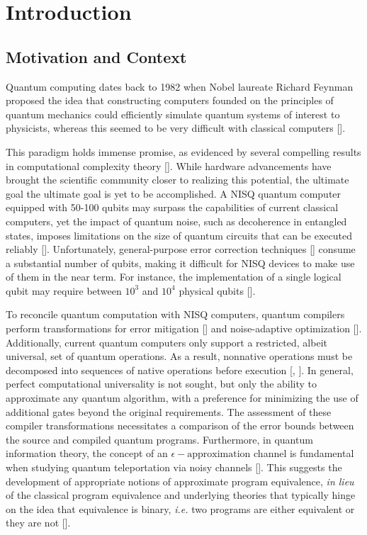 \chapter{Introduction}

\section{Motivation and Context}


Quantum computing dates back to 1982 when Nobel laureate Richard Feynman proposed the idea that constructing computers founded on the principles of quantum mechanics could efficiently simulate quantum systems of interest to physicists, whereas this seemed to be very difficult with classical computers [\cite{feynman2018simulating}].

This paradigm holds immense promise, as evidenced by several compelling results in computational complexity theory [\cite{shor1994algorithms,grover1996fast}]. While hardware advancements have brought the scientific community closer to realizing this potential, the ultimate goal the ultimate goal is yet to be accomplished. A NISQ quantum computer equipped with 50-100 qubits may surpass the capabilities of current classical computers, yet the impact of quantum noise, such as decoherence in entangled states, imposes limitations on the size of quantum circuits that can be executed reliably [\cite{preskill2018quantum}]. Unfortunately, general-purpose error correction techniques [\cite{calderbank1996good, gottesman1997stabilizer, steane1996error}] consume a substantial number of qubits, making it difficult for NISQ devices to make use of them in the near term. For instance, the implementation of a single logical qubit may require between $10^3$ and $10^4$ physical qubits [\cite{fowler2012surface}]. 

To reconcile quantum computation with NISQ computers, quantum compilers perform transformations for error mitigation [\cite{wallman2016noise}] and noise-adaptive optimization [\cite{murali2019noise}]. Additionally, current quantum computers only support a restricted, albeit universal, set of quantum operations. As a result, nonnative operations must be decomposed into sequences of native operations before execution [\cite{harrow2002efficient}, \cite{burgholzer2020advanced}]. In general, perfect computational universality is not sought, but only the ability to approximate any quantum algorithm, with a preference for minimizing the use of additional gates beyond the original requirements. The assessment of these compiler transformations necessitates a comparison of the error bounds between the source and compiled quantum programs. Furthermore, in quantum information theory, the concept of an $\epsilon-\text{approximation}$ channel is fundamental when studying quantum teleportation via noisy channels [\cite{watrous2018theory}]. This suggests the development of appropriate notions of approximate program equivalence, \textit {in lieu} of the classical program equivalence and underlying theories that typically hinge on the idea that equivalence is binary, \textit{i.e.} two programs are either equivalent or they are not [\cite{winskel1993formal}].

